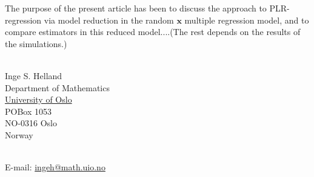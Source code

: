 \documentclass[a4paper, 11pt]{article}
\begin{document}
The purpose of the present article has been to discuss the approach to PLR-regression via model reduction in the random $\bm{x}$ multiple regression model, and to compare estimators in this reduced model....(The rest depends on the results of the simulations.)



\bigskip

\ \\
Inge S. Helland \\
Department of Mathematics \\
\href{http://uio.no}{University of Oslo} \\
POBox 1053 \\
NO-0316 Oslo \\
Norway

\ \\
E-mail: \href{mailto:ingeh@math.uio.no}{ingeh@math.uio.no}
\end{document}
